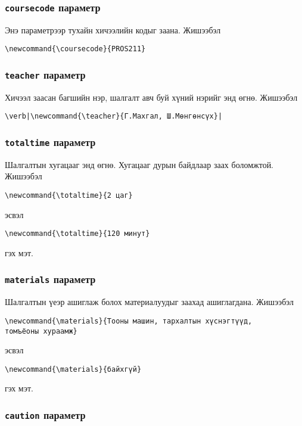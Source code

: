 \documentclass[10pt]{article}
\theoremstyle{definition}
\begin{document}
\subsubsection{\texttt{coursecode} параметр}

Энэ параметрээр тухайн хичээлийн кодыг заана. Жишээбэл
\begin{verbatim}
\newcommand{\coursecode}{PROS211}
\end{verbatim}

\subsubsection{\texttt{teacher} параметр}

Хичээл заасан багшийн нэр, шалгалт авч буй хүний нэрийг энд өгнө. Жишээбэл
\begin{verbatim}
\verb|\newcommand{\teacher}{Г.Махгал, Ш.Мөнгөнсүх}|
\end{verbatim}

\subsubsection{\texttt{totaltime} параметр}

Шалгалтын хугацааг энд өгнө. Хугацааг дурын байдлаар заах боломжтой. Жишээбэл
\begin{verbatim}
\newcommand{\totaltime}{2 цаг}
\end{verbatim}
эсвэл
\begin{verbatim}
\newcommand{\totaltime}{120 минут}
\end{verbatim}
гэх мэт.

\subsubsection{\texttt{materials} параметр}

Шалгалтын үеэр ашиглаж болох материалуудыг заахад ашиглагдана. Жишээбэл \begin{verbatim}
\newcommand{\materials}{Тооны машин, тархалтын хүснэгтүүд, 
томъёоны хураамж}
\end{verbatim}
эсвэл
\begin{verbatim}
\newcommand{\materials}{байхгүй}
\end{verbatim}
гэх мэт.

\subsubsection{\texttt{caution} параметр}
\end{document}
